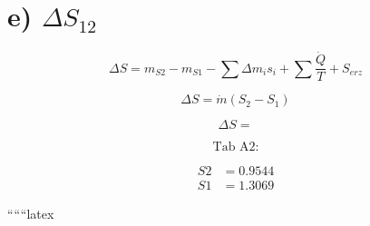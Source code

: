 \section*{e) $\Delta S_{12}$}

\[
\Delta S = m_{S2} - m_{S1} - \sum \Delta m_{i} s_{i} + \sum \frac{\dot{Q}}{T} + S_{erz}
\]

\[
\Delta S = \dot{m} (S_{2} - S_{1})
\]

\[
\Delta S =
\]

\[
\text{Tab A2:}
\]

\[
\begin{aligned}
S2 & = 0.9544 \\
S1 & = 1.3069
\end{aligned}
\]

``````latex